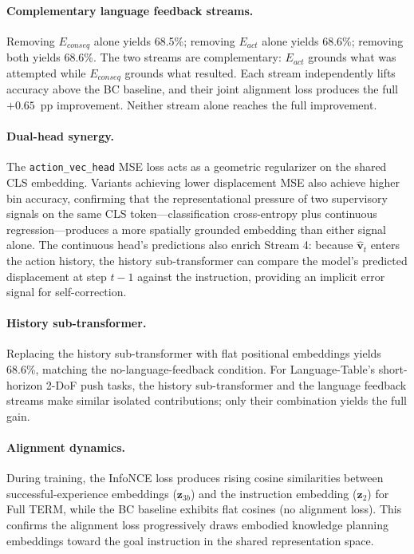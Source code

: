 \documentclass[letterpaper]{article} %
\begin{document}
\paragraph{Complementary language feedback streams.} Removing $E_{conseq}$ alone yields 68.5\%; removing $E_{act}$ alone yields 68.6\%; removing both yields 68.6\%. The two streams are complementary: $E_{act}$ grounds what was attempted while $E_{conseq}$ grounds what resulted. Each stream independently lifts accuracy above the BC baseline, and their joint alignment loss produces the full $+0.65$~pp improvement. Neither stream alone reaches the full improvement.

\paragraph{Dual-head synergy.} The \texttt{action\_vec\_head} MSE loss acts as a geometric regularizer on the shared CLS embedding. Variants achieving lower displacement MSE also achieve higher bin accuracy, confirming that the representational pressure of two supervisory signals on the same CLS token---classification cross-entropy plus continuous regression---produces a more spatially grounded embedding than either signal alone. The continuous head's predictions also enrich Stream 4: because $\hat{\mathbf{v}}_t$ enters the action history, the history sub-transformer can compare the model's predicted displacement at step $t{-}1$ against the instruction, providing an implicit error signal for self-correction.

\paragraph{History sub-transformer.} Replacing the history sub-transformer with flat positional embeddings yields 68.6\%, matching the no-language-feedback condition. For Language-Table's short-horizon 2-DoF push tasks, the history sub-transformer and the language feedback streams make similar isolated contributions; only their combination yields the full gain.

\paragraph{Alignment dynamics.} During training, the InfoNCE loss produces rising cosine similarities between successful-experience embeddings ($\mathbf{z}_{3b}$) and the instruction embedding ($\mathbf{z}_2$) for Full TERM, while the BC baseline exhibits flat cosines (no alignment loss). This confirms the alignment loss progressively draws embodied knowledge planning embeddings toward the goal instruction in the shared representation space.
\end{document}
